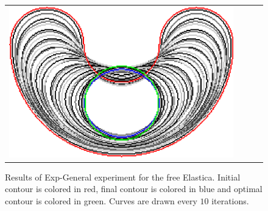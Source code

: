 \begin{figure}
\begin{tabular}{cccc}
\includegraphics[scale=0.2]{figures/chapter9/free-elastica/graphflow/bean/len_pen-0.01/radius-7/summary.pdf} 
\end{tabular}
\caption{Results of Exp-General experiment for the free Elastica. Initial contour is colored in red, final contour is colored in blue and optimal contour is colored in green. Curves are drawn every $10$ iterations.}
\label{ch9:fig:results-free-elastica-general}
\end{figure}

